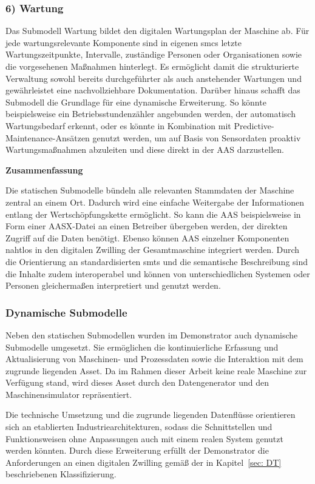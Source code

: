 \subsubsection*{6) Wartung}
Das Submodell Wartung bildet den digitalen Wartungsplan der Maschine ab. 
Für jede wartungsrelevante Komponente sind in eigenen \acsp{smc} letzte Wartungszeitpunkte, Intervalle, zuständige Personen oder Organisationen sowie die vorgesehenen Maßnahmen hinterlegt. 
Es ermöglicht damit die strukturierte Verwaltung sowohl bereits durchgeführter als auch anstehender Wartungen und gewährleistet eine nachvollziehbare Dokumentation. 
Darüber hinaus schafft das Submodell die Grundlage für eine dynamische Erweiterung. 
So könnte beispielsweise ein Betriebsstundenzähler angebunden werden, der automatisch Wartungsbedarf erkennt, oder es könnte in Kombination mit Predictive-Maintenance-Ansätzen genutzt werden, um auf Basis von Sensordaten proaktiv Wartungsmaßnahmen abzuleiten und diese direkt in der AAS darzustellen. 

\textbf{Zusammenfassung}  

Die statischen Submodelle bündeln alle relevanten Stammdaten der Maschine zentral an einem Ort. 
Dadurch wird eine einfache Weitergabe der Informationen entlang der Wertschöpfungskette ermöglicht. 
So kann die AAS beispielsweise in Form einer AASX-Datei an einen Betreiber übergeben werden, der direkten Zugriff auf die Daten benötigt. 
Ebenso können AAS einzelner Komponenten nahtlos in den digitalen Zwilling der Gesamtmaschine integriert werden. 
Durch die Orientierung an standardisierten \acsp{smt} und die semantische Beschreibung sind die Inhalte zudem interoperabel und können von unterschiedlichen Systemen oder Personen gleichermaßen interpretiert und genutzt werden. 

\newpage
\subsubsection{Dynamische Submodelle}
\label{sec:DynamischeSubmodelle}
Neben den statischen Submodellen wurden im Demonstrator auch dynamische Submodelle umgesetzt.
Sie ermöglichen die kontinuierliche Erfassung und Aktualisierung von Maschinen- und Prozessdaten sowie die Interaktion mit dem zugrunde liegenden Asset.
Da im Rahmen dieser Arbeit keine reale Maschine zur Verfügung stand, wird dieses Asset durch den Datengenerator und den Maschinensimulator repräsentiert.

Die technische Umsetzung und die zugrunde liegenden Datenflüsse orientieren sich an etablierten Industriearchitekturen, sodass die Schnittstellen und Funktionsweisen ohne Anpassungen auch mit einem realen System genutzt werden könnten.
Durch diese Erweiterung erfüllt der Demonstrator die Anforderungen an einen digitalen Zwilling gemäß der in Kapitel~\ref{sec: DT} beschriebenen Klassifizierung.

